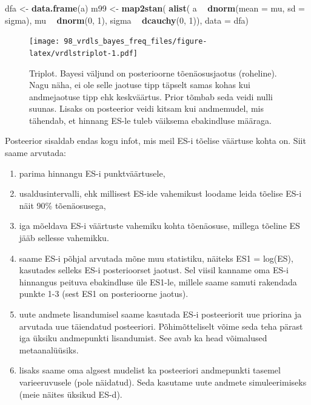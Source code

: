 \documentclass[]{book}
\newenvironment{Shaded}{\begin{snugshade}}{\end{snugshade}}
\newcommand{\KeywordTok}[1]{\textcolor[rgb]{0.13,0.29,0.53}{\textbf{#1}}}
\newcommand{\DataTypeTok}[1]{\textcolor[rgb]{0.13,0.29,0.53}{#1}}
\newcommand{\DecValTok}[1]{\textcolor[rgb]{0.00,0.00,0.81}{#1}}
\newcommand{\StringTok}[1]{\textcolor[rgb]{0.31,0.60,0.02}{#1}}
\newcommand{\OperatorTok}[1]{\textcolor[rgb]{0.81,0.36,0.00}{\textbf{#1}}}
\newcommand{\NormalTok}[1]{#1}
\begin{document}
\begin{Shaded}
\begin{Highlighting}[]
\NormalTok{dfa <-}\StringTok{ }\KeywordTok{data.frame}\NormalTok{(a)}
\NormalTok{m99 <-}\StringTok{ }\KeywordTok{map2stan}\NormalTok{(}
  \KeywordTok{alist}\NormalTok{(}
\NormalTok{    a }\OperatorTok{~}\StringTok{ }\KeywordTok{dnorm}\NormalTok{(}\DataTypeTok{mean =}\NormalTok{ mu, }\DataTypeTok{sd =}\NormalTok{ sigma),}
\NormalTok{    mu  }\OperatorTok{~}\StringTok{ }\KeywordTok{dnorm}\NormalTok{(}\DecValTok{0}\NormalTok{, }\DecValTok{1}\NormalTok{), }
\NormalTok{    sigma }\OperatorTok{~}\StringTok{ }\KeywordTok{dcauchy}\NormalTok{(}\DecValTok{0}\NormalTok{, }\DecValTok{1}\NormalTok{)), }
  \DataTypeTok{data =}\NormalTok{ dfa)}
\end{Highlighting}
\end{Shaded}

\begin{figure}
\centering
\texttt{[image: 98\_vrdls\_bayes\_freq\_files/figure-latex/vrdlstriplot-1.pdf]}
\caption{\label{fig:vrdlstriplot}Triplot. Bayesi väljund on posterioorne
tõenäosusjaotus (roheline). Nagu näha, ei ole selle jaotuse tipp täpselt
samas kohas kui andmejaotuse tipp ehk keskväärtus. Prior tõmbab seda
veidi nulli suunas. Lisaks on posteerior veidi kitsam kui andmemudel,
mis tähendab, et hinnang ES-le tuleb väiksema ebakindluse määraga.}
\end{figure}

Posteerior sisaldab endas kogu infot, mis meil ES-i tõelise väärtuse
kohta on. Siit saame arvutada:

\begin{enumerate}
\def\labelenumi{\arabic{enumi}.}
\item
  parima hinnangu ES-i punktväärtusele,
\item
  usaldusintervalli, ehk millisest ES-ide vahemikust loodame leida
  tõelise ES-i näit 90\% tõenäosusega,
\item
  iga mõeldava ES-i väärtuste vahemiku kohta tõenäosuse, millega tõeline
  ES jääb sellesse vahemikku.
\item
  saame ES-i põhjal arvutada mõne muu statistiku, näiteks ES1 = log(ES),
  kasutades selleks ES-i posterioorset jaotust. Sel viisil kanname oma
  ES-i hinnangus peituva ebakindluse üle ES1-le, millele saame samuti
  rakendada punkte 1-3 (sest ES1 on posterioorne jaotus).
\item
  uute andmete lisandumisel saame kasutada ES-i posteeriorit uue
  priorina ja arvutada uue täiendatud posteeriori. Põhimõtteliselt võime
  seda teha pärast iga üksiku andmepunkti lisandumist. See avab ka head
  võimalused metaanalüüsiks.
\item
  lisaks saame oma algsest mudelist ka posteeriori andmepunkti tasemel
  varieeruvusele (pole näidatud). Seda kasutame uute andmete
  simuleerimiseks (meie näites üksikud ES-d).
\end{enumerate}
\end{document}
